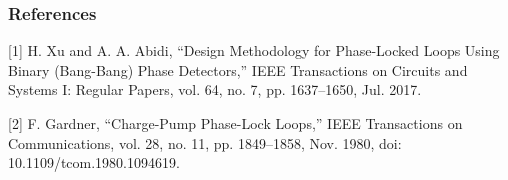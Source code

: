 \documentclass[t, screen, aspectratio=43]{beamer}
\begin{document}
\begin{frame}
	\frametitle{References}
		\scriptsize
		[1]  H. Xu and A. A. Abidi, “Design Methodology for Phase-Locked Loops Using Binary (Bang-Bang) Phase Detectors,” IEEE Transactions on Circuits and Systems I: Regular Papers, vol. 64, no. 7, pp. 1637–1650, Jul. 2017.\par
		\vspace{0.5em}
		[2] F. Gardner, “Charge-Pump Phase-Lock Loops,” IEEE Transactions on Communications, vol. 28, no. 11, pp. 1849–1858, Nov. 1980, doi: 10.1109/tcom.1980.1094619.\par
		\vspace{0.5em}
\end{frame}
\end{document}
